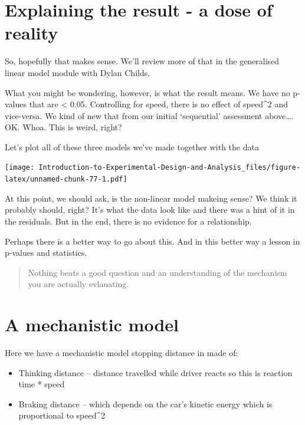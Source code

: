 \documentclass[
]{book}
\providecommand{\tightlist}{%
  \setlength{\itemsep}{0pt}\setlength{\parskip}{0pt}}
\begin{document}
\hypertarget{explaining-the-result---a-dose-of-reality}{%
\section{Explaining the result - a dose of reality}\label{explaining-the-result---a-dose-of-reality}}

So, hopefully that makes sense. We'll review more of that in the generalised linear model module with Dylan Childs.

What you might be wondering, however, is what the result means. We have no p-values that are \textless{} 0.05. Controlling for speed, there is no effect of speed\^{}2 and vice-versa. We kind of new that from our initial `sequential' assessment above\ldots.
OK. Whoa. This is weird, right?

Let's plot all of these three models we've made together with the data

\texttt{[image: Introduction-to-Experimental-Design-and-Analysis\_files/figure-latex/unnamed-chunk-77-1.pdf]}

At this point, we should ask, is the non-linear model makeing sense? We think it probably should, right? It's what the data look like and there was a hint of it in the residuals. But in the end, there is no evidence for a relationship.

Perhaps there is a better way to go about this. And in this better way a lesson in p-values and statistics.

\begin{quote}
Nothing beats a good question and an understanding of the mechanism you are actually evlauating.
\end{quote}

\hypertarget{a-mechanistic-model}{%
\section{A mechanistic model}\label{a-mechanistic-model}}

Here we have a mechanistic model stopping distance in made of:

\begin{itemize}
\tightlist
\item
  Thinking distance -- distance travelled while driver reacts so this is reaction time * speed
\item
  Braking distance -- which depends on the car's kinetic energy which is proportional to speed\^{}2
\end{itemize}
\end{document}
